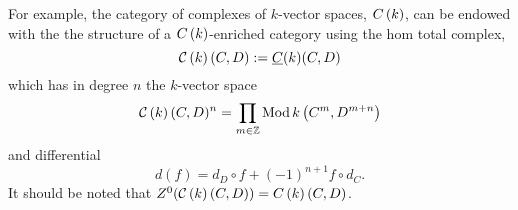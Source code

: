 For example, the category of complexes of \(k\)-vector spaces, \(C\left(k\right)\), can be endowed with the the structure of a \(C\left(k\right)\)-enriched category using the hom total complex, \[\mathcal{C}\left(k\right)(C,D) := \underline{C}(k)(C,D)\] which has in degree \(n\) the \(k\)-vector space
\[\mathcal{C}\left(k\right)(C,D)^n = \prod_{m \in \mathbb{Z}}\operatorname{Mod}k\left(C^m, D^{m + n}\right)\]
and differential
\[d(f) = d_D \circ f + (-1)^{n+1} f \circ d_C.\]
It should be noted that \(Z^0(\mathcal{C}\left(k\right)(C,D)) = C\left(k\right)(C,D)\).

